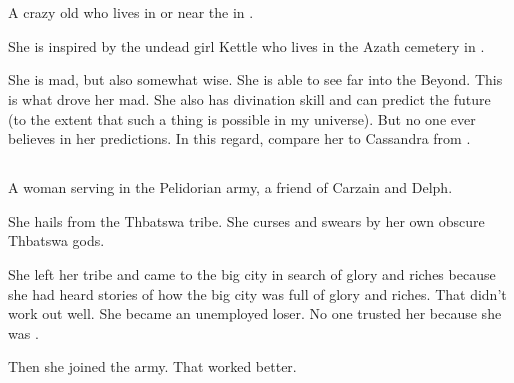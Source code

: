 \chapter[Meccara]{\Meccara}
\section{\Uswa}
\index{\Uswa}
A crazy old \meccaran{} who lives in or near the  in \Malcur. 

She is inspired by the undead girl Kettle who lives in the Azath cemetery in \cite{StevenErikson:MidnightTides}. 

She is mad, but also somewhat wise. She is able to see far into the Beyond. This is what drove her mad. She also has divination skill and can predict the future (to the extent that such a thing is possible in my universe). But no one ever believes in her predictions. In this regard, compare her to Cassandra from .















\section{\Tsekkect}
A \meccaran{} woman serving in the Pelidorian army, a friend of Carzain and Delph. 

She hails from the Thbatswa tribe. 
She curses and swears by her own obscure Thbatswa gods. 

She left her tribe and came to the big city in search of glory and riches because she had heard stories of how the big city was full of glory and riches. 
That didn't work out well. 
She became an unemployed loser. 
No one trusted her because she was \meccaran. 

Then she joined the army. 
That worked better. 






































